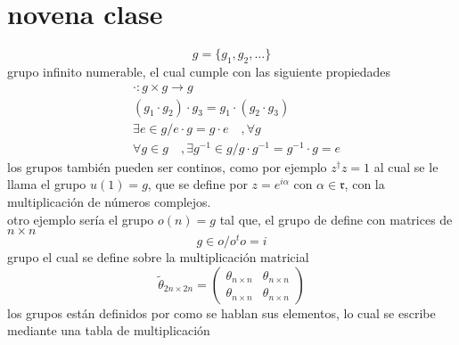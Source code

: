 \documentclass[../main.tex]{subfiles}
\begin{document}
\section{novena clase}
\begin{equation*}
  g=\{g_1,g_2,\dots\}
\end{equation*}
grupo infinito numerable, el cual cumple con las siguiente propiedades
\begin{align*}
  & \cdot : g\times g \rightarrow g \\
  &  (g_1\cdot g_2) \cdot g_3 = g_1 \cdot (g_2\cdot g_3) \\
  &\exists e\in g / e\cdot g = g\cdot e\quad ,\forall g \\
  &\forall g\in g \quad, \exists g^{-1}\in g /g\cdot g^{-1} = g^{-1}\cdot g = e
\end{align*}
los grupos también pueden ser continos, como por ejemplo $z^\dagger z = 1$ al cual se le llama el grupo $u(1)=g$, que se define por $z=e^{i\alpha}$ con $\alpha \in \mathfrak{r}$, con la multiplicación de números complejos. \\
otro ejemplo sería el grupo $o(n)=g$ tal que, el grupo de define con matrices de $n\times n$
\begin{equation*}
  g\in o / o^to=i
\end{equation*}
grupo el cual se define sobre la multiplicación matricial
\begin{equation*}
  \tilde{\theta}_{2n\times 2n} = \begin{pmatrix}
    \theta_{n\times n} & \theta_{n\times n} \\
    \theta_{n\times n } & \theta_{n\times n}
  \end{pmatrix}
\end{equation*}
los grupos están definidos por como se hablan sus elementos, lo cual se escribe mediante una tabla de multiplicación
\end{document}
